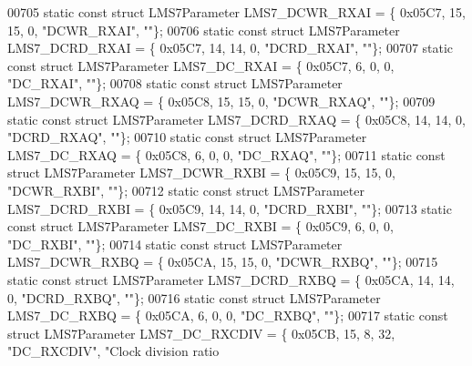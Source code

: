 \begin{DoxyCode}
00705 \textcolor{keyword}{static} \textcolor{keyword}{const} \textcolor{keyword}{struct }LMS7Parameter LMS7_DCWR_RXAI = \{ 0x05C7, 15, 15, 0, \textcolor{stringliteral}{"DCWR\_RXAI"}, \textcolor{stringliteral}{""}\};
00706 \textcolor{keyword}{static} \textcolor{keyword}{const} \textcolor{keyword}{struct }LMS7Parameter LMS7_DCRD_RXAI = \{ 0x05C7, 14, 14, 0, \textcolor{stringliteral}{"DCRD\_RXAI"}, \textcolor{stringliteral}{""}\};
00707 \textcolor{keyword}{static} \textcolor{keyword}{const} \textcolor{keyword}{struct }LMS7Parameter LMS7_DC_RXAI = \{ 0x05C7, 6, 0, 0, \textcolor{stringliteral}{"DC\_RXAI"}, \textcolor{stringliteral}{""}\};
00708 \textcolor{keyword}{static} \textcolor{keyword}{const} \textcolor{keyword}{struct }LMS7Parameter LMS7_DCWR_RXAQ = \{ 0x05C8, 15, 15, 0, \textcolor{stringliteral}{"DCWR\_RXAQ"}, \textcolor{stringliteral}{""}\};
00709 \textcolor{keyword}{static} \textcolor{keyword}{const} \textcolor{keyword}{struct }LMS7Parameter LMS7_DCRD_RXAQ = \{ 0x05C8, 14, 14, 0, \textcolor{stringliteral}{"DCRD\_RXAQ"}, \textcolor{stringliteral}{""}\};
00710 \textcolor{keyword}{static} \textcolor{keyword}{const} \textcolor{keyword}{struct }LMS7Parameter LMS7_DC_RXAQ = \{ 0x05C8, 6, 0, 0, \textcolor{stringliteral}{"DC\_RXAQ"}, \textcolor{stringliteral}{""}\};
00711 \textcolor{keyword}{static} \textcolor{keyword}{const} \textcolor{keyword}{struct }LMS7Parameter LMS7_DCWR_RXBI = \{ 0x05C9, 15, 15, 0, \textcolor{stringliteral}{"DCWR\_RXBI"}, \textcolor{stringliteral}{""}\};
00712 \textcolor{keyword}{static} \textcolor{keyword}{const} \textcolor{keyword}{struct }LMS7Parameter LMS7_DCRD_RXBI = \{ 0x05C9, 14, 14, 0, \textcolor{stringliteral}{"DCRD\_RXBI"}, \textcolor{stringliteral}{""}\};
00713 \textcolor{keyword}{static} \textcolor{keyword}{const} \textcolor{keyword}{struct }LMS7Parameter LMS7_DC_RXBI = \{ 0x05C9, 6, 0, 0, \textcolor{stringliteral}{"DC\_RXBI"}, \textcolor{stringliteral}{""}\};
00714 \textcolor{keyword}{static} \textcolor{keyword}{const} \textcolor{keyword}{struct }LMS7Parameter LMS7_DCWR_RXBQ = \{ 0x05CA, 15, 15, 0, \textcolor{stringliteral}{"DCWR\_RXBQ"}, \textcolor{stringliteral}{""}\};
00715 \textcolor{keyword}{static} \textcolor{keyword}{const} \textcolor{keyword}{struct }LMS7Parameter LMS7_DCRD_RXBQ = \{ 0x05CA, 14, 14, 0, \textcolor{stringliteral}{"DCRD\_RXBQ"}, \textcolor{stringliteral}{""}\};
00716 \textcolor{keyword}{static} \textcolor{keyword}{const} \textcolor{keyword}{struct }LMS7Parameter LMS7_DC_RXBQ = \{ 0x05CA, 6, 0, 0, \textcolor{stringliteral}{"DC\_RXBQ"}, \textcolor{stringliteral}{""}\};
00717 \textcolor{keyword}{static} \textcolor{keyword}{const} \textcolor{keyword}{struct }LMS7Parameter LMS7_DC_RXCDIV = \{ 0x05CB, 15, 8, 32, \textcolor{stringliteral}{"DC\_RXCDIV"}, \textcolor{stringliteral}{"Clock division ratio
}
\end{DoxyCode}

